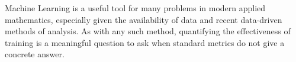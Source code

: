 

Machine Learning is a useful tool for many problems in modern applied mathematics, especially given the
availability of data and recent data-driven methods of analysis. As with any such method, quantifying the 
effectiveness of training is a meaningful question to ask when standard metrics do not give a concrete 
answer.
